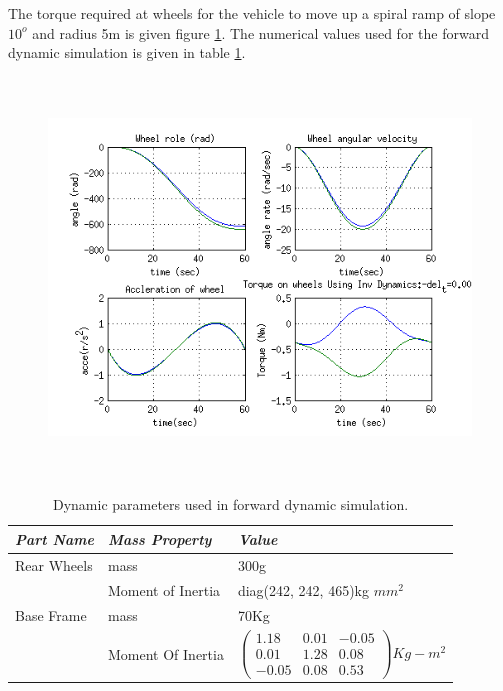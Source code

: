 The torque required at wheels for the vehicle to  move up a spiral ramp  of slope $10^o$ and radius 5m is given figure \ref{fig:spiral}. The numerical values used for the forward dynamic simulation is given in table \ref{tb:massproperty}.
 \begin{figure}
	\includegraphics[height=300pt,keepaspectratio]{Chapter4/fig/FD}
	\label{fig:spiral} 
\end{figure} 
%
\begin{table}[!htbp]
	\caption{Dynamic parameters used in forward dynamic simulation.}
	\label{tb:massproperty}
	\centering
	\begin{tabular}{l l l}
		\hline
		\emph{Part Name}  & \emph{Mass Property} & \emph{Value} \\
		\hline
		Rear Wheels  & mass &300g \\ 
		 & Moment of Inertia & diag(242, 242, 465)kg $mm^2$\\
		Base Frame & mass & 70Kg \\
		 & Moment Of Inertia & $ \begin{pmatrix}
		 1.18& 0.01&-0.05\\ 0.01 & 1.28 & 0.08\\
		 -0.05 & 0.08 & 0.53
		 \end{pmatrix} Kg-m^2$ \\
		\hline
	\end{tabular}
\end{table}
 

